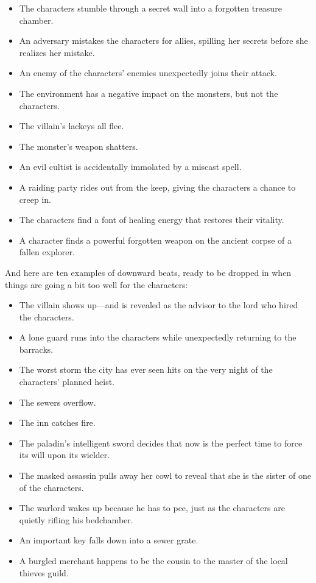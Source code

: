 \documentclass[10pt,a4paper,twoside,bg=print,twocolumn,openany,nodeprecatedcode]{dndbook}
\begin{document}
\begin{itemize}
\item The characters stumble through a secret wall into a forgotten treasure chamber.
\item An adversary mistakes the characters for allies, spilling her secrets before she realizes her mistake.
\item An enemy of the characters' enemies unexpectedly joins their attack.
\item The environment has a negative impact on the monsters, but not the characters.
\item The villain's lackeys all flee.
\item The monster's weapon shatters.
\item An evil cultist is accidentally immolated by a miscast spell.
\item A raiding party rides out from the keep, giving the characters a chance to creep in.
\item The characters find a font of healing energy that restores their vitality.
\item A character finds a powerful forgotten weapon on the ancient corpse of a fallen explorer.
\end{itemize}

And here are ten examples of downward beats, ready to be dropped in when things are going a bit too well for the characters:

\begin{itemize}
\item The villain shows up—and is revealed as the advisor to the lord who hired the characters.
\item A lone guard runs into the characters while unexpectedly returning to the barracks.
\item The worst storm the city has ever seen hits on the very night of the characters' planned heist.
\item The sewers overflow.
\item The inn catches fire.
\item The paladin's intelligent sword decides that now is the perfect time to force its will upon its wielder.
\item The masked assassin pulls away her cowl to reveal that she is the sister of one of the characters.
\item The warlord wakes up because he has to pee, just as the characters are quietly rifling his bedchamber.
\item An important key falls down into a sewer grate.
\item A burgled merchant happens to be the cousin to the master of the local thieves guild.
\end{itemize}
\end{document}
